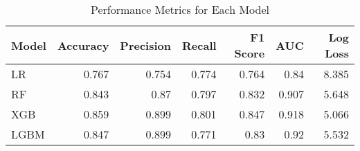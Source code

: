 \begin{table}[H]\centering
\caption{Performance Metrics for Each Model}
\label{Table 3 :performance_metrics}
\begin{tabular}{lrrrrrr}
\toprule
Model & Accuracy & Precision & Recall & F1 Score & AUC & Log Loss \\
\midrule
LR & 0.767 & 0.754 & 0.774 & 0.764 & 0.84 & 8.385 \\
RF & 0.843 & 0.87 & 0.797 & 0.832 & 0.907 & 5.648 \\
XGB & 0.859 & 0.899 & 0.801 & 0.847 & 0.918 & 5.066 \\
LGBM & 0.847 & 0.899 & 0.771 & 0.83 & 0.92 & 5.532 \\
\bottomrule
\end{tabular}
\end{table}
